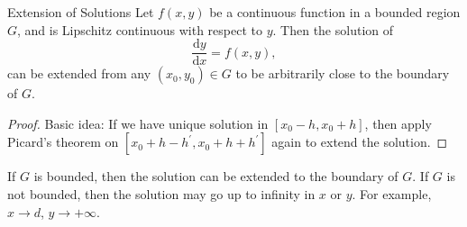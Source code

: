 \begin{theorem}{Extension of Solutions}{}
  Let $f(x,y)$ be a continuous function in a bounded region $G$,
  and is Lipschitz continuous with respect to $y$.
  Then the solution of 
  \begin{equation}
    \frac{\mathrm{d}y}{\mathrm{d} x} = f(x,y),
  \end{equation}
  can be extended from any $(x_0, y_0) \in G$ to be arbitrarily close to the
  boundary of $G$.
\end{theorem}

\begin{proof}
  Basic idea: If we have unique solution in $[x_0 - h, x_0 + h]$,
  then apply Picard's theorem on $[x_0 + h - h^{\prime}, x_0 + h + h^{\prime}]$ again
  to extend the solution.
\end{proof}

\begin{note}
  If $G$ is bounded, then the solution can be extended to the boundary of $G$.
  If $G$ is not bounded, then the solution may go up to infinity in $x$ or $y$.
  For example, $x \rightarrow d$, $y \rightarrow +\infty$.
\end{note}




